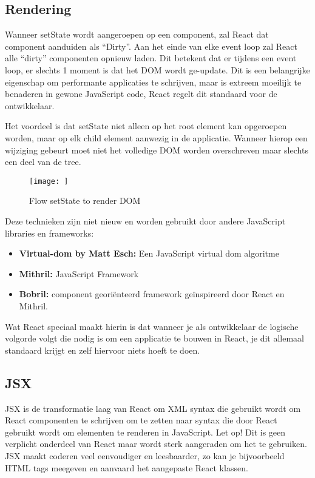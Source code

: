 	\subsection{Rendering}
		
		Wanneer setState wordt aangeroepen op een component, zal React dat component aanduiden als ``Dirty''. Aan het einde van elke event loop zal React alle ``dirty'' componenten opnieuw laden. Dit betekent dat er tijdens een event loop, er slechts 1 moment is dat het DOM wordt ge-update. Dit is een belangrijke eigenschap om performante applicaties te schrijven, maar is extreem moeilijk te benaderen in gewone JavaScript code, React regelt dit standaard voor de ontwikkelaar.
		
		Het voordeel is dat setState niet alleen op het root element kan opgeroepen worden, maar op elk child element aanwezig in de applicatie. Wanneer hierop een wijziging gebeurt moet niet het volledige DOM worden overschreven maar slechts een deel van de tree.
		
		\begin{figure}
			\centering
			\texttt{[image: ]}%
			\caption{Flow setState to render DOM}%
			\label{fig:setstateflow}%
		\end{figure}
		
		Deze technieken zijn niet nieuw en worden gebruikt door andere JavaScript libraries en frameworks:
		
		\begin{itemize}
			\item \textbf{Virtual-dom by Matt Esch:} Een JavaScript virtual dom algoritme
			\item \textbf{Mithril:} JavaScript Framework
			\item \textbf{Bobril:} component georiënteerd framework geïnspireerd door React en Mithril.
		\end{itemize}
		
		Wat React speciaal maakt hierin is dat wanneer je als ontwikkelaar de logische volgorde volgt die nodig is om een applicatie te bouwen in React, je dit allemaal standaard krijgt en zelf hiervoor niets hoeft te doen.
	
	\subsection{JSX}
		
		JSX is de transformatie laag van React om XML syntax die gebruikt wordt om React componenten te schrijven om te zetten naar syntax die door React gebruikt wordt om elementen te renderen in JavaScript. Let op! Dit is geen verplicht onderdeel van React maar wordt sterk aangeraden om het te gebruiken. JSX maakt coderen veel eenvoudiger en leesbaarder, zo kan je bijvoorbeeld HTML tags meegeven en aanvaard het aangepaste React klassen.
		
